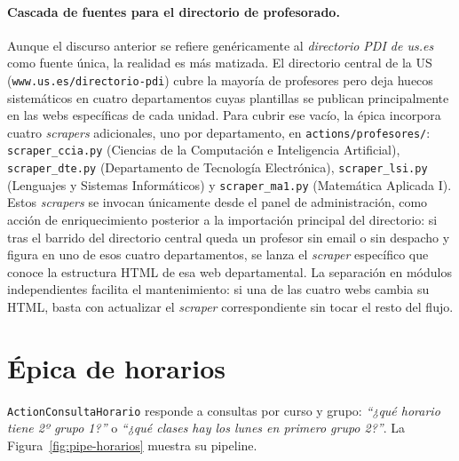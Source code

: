 \paragraph{Cascada de fuentes para el directorio de profesorado.} Aunque el discurso anterior se refiere genéricamente al \textit{directorio PDI de us.es} como fuente única, la realidad es más matizada. El directorio central de la US (\texttt{www.us.es/directorio-pdi}) cubre la mayoría de profesores pero deja huecos sistemáticos en cuatro departamentos cuyas plantillas se publican principalmente en las webs específicas de cada unidad. Para cubrir ese vacío, la épica incorpora cuatro \textit{scrapers} adicionales, uno por departamento, en \texttt{actions/profesores/}: \texttt{scraper\_ccia.py} (Ciencias de la Computación e Inteligencia Artificial), \texttt{scraper\_dte.py} (Departamento de Tecnología Electrónica), \texttt{scraper\_lsi.py} (Lenguajes y Sistemas Informáticos) y \texttt{scraper\_ma1.py} (Matemática Aplicada I). Estos \textit{scrapers} se invocan únicamente desde el panel de administración, como acción de enriquecimiento posterior a la importación principal del directorio: si tras el barrido del directorio central queda un profesor sin email o sin despacho y figura en uno de esos cuatro departamentos, se lanza el \textit{scraper} específico que conoce la estructura HTML de esa web departamental. La separación en módulos independientes facilita el mantenimiento: si una de las cuatro webs cambia su HTML, basta con actualizar el \textit{scraper} correspondiente sin tocar el resto del flujo.

\section{Épica de horarios}\label{sec:impl-horarios}

\texttt{ActionConsultaHorario} responde a consultas por curso y grupo: \textit{``¿qué horario tiene 2º grupo 1?''} o \textit{``¿qué clases hay los lunes en primero grupo 2?''}. La Figura~\ref{fig:pipe-horarios} muestra su pipeline.

